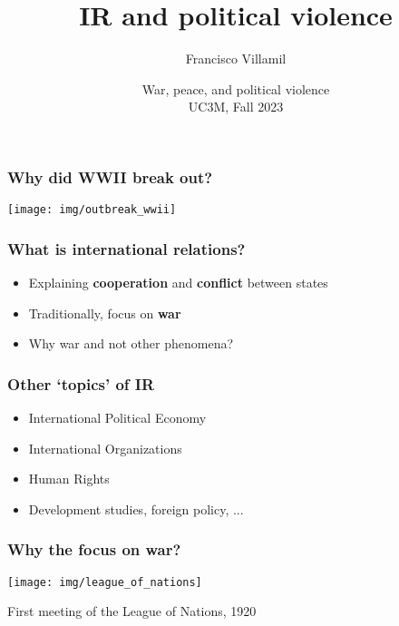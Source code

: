 \documentclass[aspectratio=43,handout]{beamer}
\title{\huge IR and political violence}
\author{Francisco Villamil}
\date{War, peace, and political violence\\UC3M, Fall 2023}
\begin{document}
\begin{frame}
  \titlepage
\end{frame}

\begin{frame}
\frametitle{Why did WWII break out?}
\centering

\texttt{[image: img/outbreak\_wwii]}

\end{frame}

\begin{frame}
\frametitle{What is international relations?}
\centering

\begin{itemize}
  \item Explaining \textbf{cooperation} and \textbf{conflict} between states
  \item Traditionally, focus on \textbf{war}
  \item Why war and not other phenomena?
\end{itemize}

\end{frame}

\begin{frame}
\frametitle{Other `topics' of IR}
\centering

\begin{itemize}[<+->]
  \item International Political Economy
  \item International Organizations
  \item Human Rights
  \item Development studies, foreign policy, ...
\end{itemize}

\end{frame}



\begin{frame}
\frametitle{Why the focus on war?}
\centering

\texttt{[image: img/league\_of\_nations]}

First meeting of the League of Nations, 1920

\end{frame}
\end{document}
